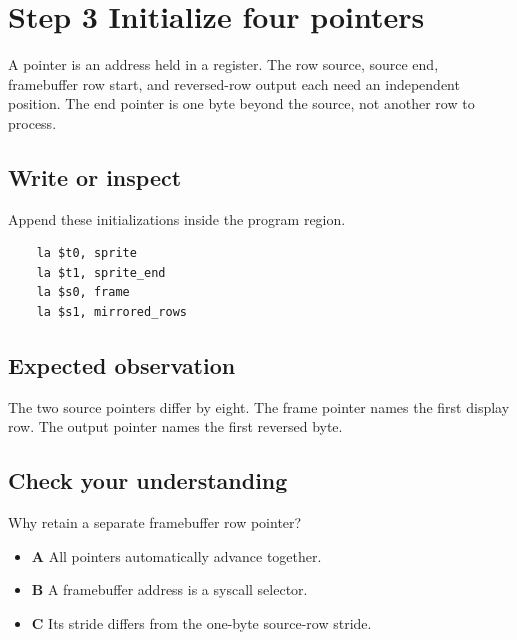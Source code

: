 \section{Step 3 Initialize four
  pointers}\label{003-eight-byte-sprite-s03-step-3-initialize-four-pointers}

A pointer is an address held in a register. The row source, source end,
framebuffer row start, and reversed-row output each need an independent
position. The end pointer is one byte beyond the source, not another row
to process.

\subsection{Write or
  inspect}\label{003-eight-byte-sprite-s03-write-or-inspect}

Append these initializations inside the program region.

\begin{verbatim}
    la $t0, sprite
    la $t1, sprite_end
    la $s0, frame
    la $s1, mirrored_rows
\end{verbatim}

\subsection{Expected
  observation}\label{003-eight-byte-sprite-s03-expected-observation}

The two source pointers differ by eight. The frame pointer names the
first display row. The output pointer names the first reversed byte.

\subsection{Check your
  understanding}\label{003-eight-byte-sprite-s03-check-your-understanding}

Why retain a separate framebuffer row pointer?

\begin{itemize}
  \tightlist
  \item
        \textbf{A} All pointers automatically advance together.
  \item
        \textbf{B} A framebuffer address is a syscall selector.
  \item
        \textbf{C} Its stride differs from the one-byte source-row stride.
\end{itemize}
